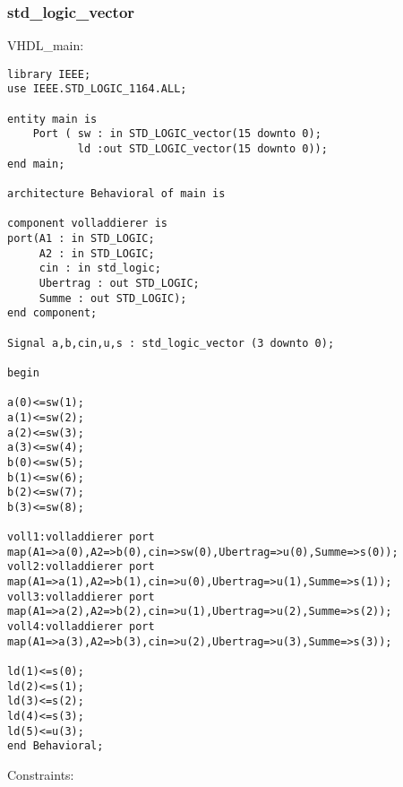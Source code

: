 \documentclass{article}
\begin{document}
\subsubsection{std\_logic\_vector}
VHDL\_main:\newline
\begin{verbatim}
library IEEE;
use IEEE.STD_LOGIC_1164.ALL;

entity main is
    Port ( sw : in STD_LOGIC_vector(15 downto 0);
           ld :out STD_LOGIC_vector(15 downto 0));
end main;

architecture Behavioral of main is

component volladdierer is
port(A1 : in STD_LOGIC;
     A2 : in STD_LOGIC;
     cin : in std_logic;
     Ubertrag : out STD_LOGIC;
     Summe : out STD_LOGIC);
end component;

Signal a,b,cin,u,s : std_logic_vector (3 downto 0);

begin

a(0)<=sw(1);
a(1)<=sw(2);
a(2)<=sw(3);
a(3)<=sw(4);
b(0)<=sw(5);
b(1)<=sw(6);
b(2)<=sw(7);
b(3)<=sw(8);

voll1:volladdierer port map(A1=>a(0),A2=>b(0),cin=>sw(0),Ubertrag=>u(0),Summe=>s(0));
voll2:volladdierer port map(A1=>a(1),A2=>b(1),cin=>u(0),Ubertrag=>u(1),Summe=>s(1));
voll3:volladdierer port map(A1=>a(2),A2=>b(2),cin=>u(1),Ubertrag=>u(2),Summe=>s(2));
voll4:volladdierer port map(A1=>a(3),A2=>b(3),cin=>u(2),Ubertrag=>u(3),Summe=>s(3));

ld(1)<=s(0);
ld(2)<=s(1);
ld(3)<=s(2);
ld(4)<=s(3);
ld(5)<=u(3);
end Behavioral;
\end{verbatim}
Constraints:\newline
\end{document}
